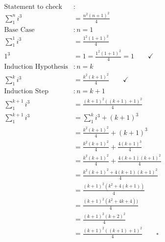 \documentclass[12pt]{article}
\begin{document}
 
\begin{align*}
\text{Statement to check}&:\\
\sum_{1}^{n}i^3&=\frac{n^2(n+1)^2}{4}\\
\text{Base Case}&: n=1\\
\sum_{1}^{1}i^3&=\frac{1^2(1+1)^2}{4}\\
1^3&= 1 = \frac{1^2(1+1)^2}{4} = 1 \qquad \checkmark\\
\text{Induction Hypothesis}&: n=k\\
\sum_{1}^{k}i^3&=\frac{k^2(k+1)^2}{4}\qquad \checkmark\\
\text{Induction Step}&: n=k+1\\
\sum_{1}^{k+1}i^3&=\frac{(k+1)^2((k+1)+1)^2}{4}\\
\sum_{1}^{k+1}i^3&=\sum_{1}^{k}i^3 + (k+1)^3\\
&=\frac{k^2(k+1)^2}{4} + (k+1)^3\\
&=\frac{k^2(k+1)^2}{4} + \frac{4(k+1)^3}{4}\\
&=\frac{k^2(k+1)^2}{4} + \frac{4(k+1)(k+1)^2}{4}\\
&=\frac{k^2(k+1)^2 + 4(k+1)(k+1)^2}{4}\\
&=\frac{(k+1)^2( k^2 + 4(k+1) )}{4}\\
&=\frac{(k+1)^2( k^2 + 4k + 4) )}{4}\\
&=\frac{(k+1)^2(k + 2)^2}{4}\\
&=\frac{(k+1)^2((k + 1) + 1)^2}{4} \qquad \square
\end{align*} 
\end{document}

